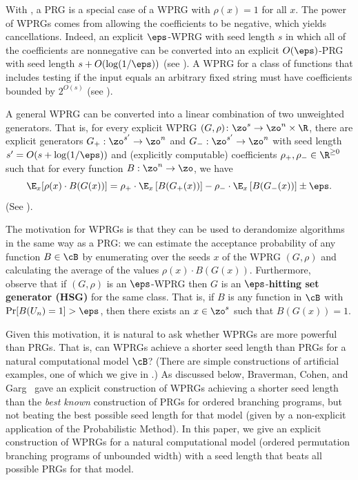 With , a PRG is a special case of a WPRG with $\rho(x)=1$ for all $x$.  The power of WPRGs comes from allowing the coefficients
to be negative, which yields cancellations.  Indeed, an explicit $\eps$-WPRG with seed length $s$ in which all of the coefficients are nonnegative can be converted into an explicit $O(\eps)$-PRG with seed length $s+O(\log(1/\eps))$ (see ). A WPRG for a class of functions that includes testing if the input equals an arbitrary fixed string must have coefficients bounded by $2^{O(s)}$ (see ).

A general WPRG can be converted into a linear combination of two unweighted generators. That is, for every explicit WPRG 
$(G,\rho) \colon \zo^s \to \zo^n\times \R$, there are 
explicit generators $G_+ : \zo^{s'}\rightarrow \zo^n$ and $G_- : \zo^{s'}\rightarrow \zo^n$ with seed length
$s'=O(s+\log(1/\eps))$ and (explicitly computable) coefficients $\rho_+,\rho_-\in \R^{\geq 0}$ such that for every function $B : \zo^n\rightarrow \zo$, we have %
$$\E_x[\rho(x)\cdot B(G(x))] = 
\rho_+\cdot \E_x\left[B(G_+(x))\right] - \rho_-\cdot \E_x\left[B(G_-(x))\right]\pm \eps.$$
(See ).

The motivation for WPRGs is that they can be used to derandomize algorithms in the same way as a PRG:
we can estimate the acceptance probability of any function $B\in \cB$ by enumerating over the seeds $x$ of the WPRG $(G,\rho)$ and calculating the average of the values $\rho(x)\cdot B(G(x))$.
Furthermore, ~\cite{BravermanCoGa18} observe that if $(G,\rho)$ is an $\eps$-WPRG then $G$ is an $\eps$-\textbf{hitting set generator (HSG)} for the same class.  That is, if $B$ is any function in $\cB$ with $\Pr[B(U_n)=1]>\eps$, then there exists an $x\in \zo^s$ such that $B(G(x))=1$.

Given this motivation, it is natural to ask whether WPRGs are more powerful than PRGs.  That is, can WPRGs achieve a shorter seed length than PRGs for a natural computational model $\cB$?  (There are simple constructions of artificial examples, one of which we give in .) 
As discussed below, Braverman, Cohen, and Garg~\cite{BravermanCoGa18} gave an explicit construction of WPRGs achieving a shorter seed length than the \emph{best known} construction of PRGs for ordered branching programs, but not beating the best possible seed length for that model (given by a non-explicit application of the Probabilistic Method). In this %
paper,  %
we give an explicit construction of WPRGs for a natural computational model (ordered permutation branching programs of unbounded width) with a
seed length that beats all possible PRGs for that model. 


